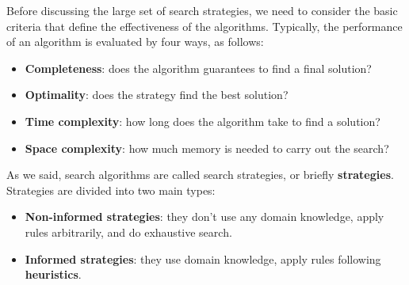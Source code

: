 Before discussing the large set of search strategies, we need to consider the basic criteria that define the effectiveness of the algorithms. Typically, the performance of an algorithm
is evaluated by four ways, as follows:
\begin{itemize}
    \renewcommand{\labelitemi}{-}
    \item \textbf{Completeness}: does the algorithm guarantees to find a final solution?
    \item \textbf{Optimality}: does the strategy find the best solution?
    \item \textbf{Time complexity}: how long does the algorithm take to find a solution?
    \item \textbf{Space complexity}: how much memory is needed to carry out the search?
\end{itemize}
As we said, search algorithms are called search strategies, or briefly \textbf{strategies}. Strategies are divided into two main types:
\begin{itemize}
    \renewcommand{\labelitemi}{-}
    \item \textbf{Non-informed strategies}: they don't use any domain knowledge, apply rules arbitrarily, and do exhaustive search.
    \item \textbf{Informed strategies}: they use domain knowledge, apply rules following \textbf{heuristics}.
\end{itemize}